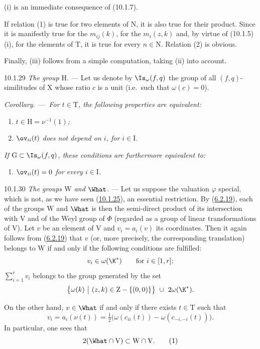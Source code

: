 \documentclass[12pt,a4paper,oneside,english]{smfart}
\makeatletter
\newcommand{\btanchor}[1]{\leavevmode\Hy@raisedlink{\hypertarget{bt:#1}{}}}
\newcommand{\btref}[1]{\hyperlink{bt:#1}{#1}}
\newcommand{\btunnum}[1]{\par\medskip\noindent\emph{#1}.\ ---\ \ignorespaces}
\theoremstyle{definition}
\theoremstyle{bt}
\makeatother
\begin{document}
\pf
(i) is an immediate consequence of (10.1.7).

If relation (1) is true for two elements of $\mathrm{N}$, it is also true for
their product. Since it is manifestly true for the $m_{ij}(k)$, for the
$m_i(z,k)$ and, by virtue of (10.1.5)\,(i), for the elements of $\mathrm{T}$, it
is true for every $n\in\mathrm{N}$. Relation (2) is obvious.

Finally, (iii) follows from a simple computation, taking (ii) into account.

\num{10.1.29}\btanchor{10.1.29} \emph{The group $\mathrm{H}$.} --- Let us denote by
$\Is_\omega(f,q)$ the group of all $(f,q)$-similitudes of $\mathrm{X}$ whose
ratio $c$ is a unit (i.e.\ such that $\omega(c)=0$).

\btunnum{Corollary}\emph{For $t\in\mathrm{T}$, the following
properties are equivalent:}
\begin{enumerate}[label=(\roman*),leftmargin=2.5em]
\item \emph{$t\in \mathrm{H}=\nu^{-1}(1)$;}
\item \emph{$\ov_{ii}(t)$ does not depend on $i$, for $i\in\mathrm{I}$.}
\end{enumerate}
\emph{If $\mathrm{G}\subset \Is_\omega(f,q)$, these conditions are furthermore
equivalent to:}
\begin{enumerate}[label=(\roman*),leftmargin=2.5em,start=3]
\item \emph{$\ov_{ii}(t)=0$ for every $i\in\mathrm{I}$.}
\end{enumerate}

\num{10.1.30}\btanchor{10.1.30} \emph{The groups $\mathrm{W}$ and $\What$.} --- Let us suppose the
valuation $\varphi$ special, which is not, as we have seen (\btref{10.1.25}), an
essential restriction. By (\btref{6.2.19}), each of the groups $\mathrm{W}$ and $\What$
is then the semi-direct product of its intersection with $\mathrm{V}$ and of the
Weyl group of $\Phi$ (regarded as a group of linear transformations of
$\mathrm{V}$). Let $v$ be an element of $\mathrm{V}$ and $v_i=a_i(v)$ its
coordinates. Then it again follows from (\btref{6.2.19}) that $v$ (or, more precisely,
the corresponding translation) belongs to $\mathrm{W}$ if and only if the
following conditions are fulfilled:
\[
v_i\in\omega(\K^{*})\qquad\text{for } i\in[1,r];
\]
$\sum_{i=1}^{r} v_i$ belongs to the group generated by the set
\[
\bigl\{\omega(k)\ \big|\ (z,k)\in \mathrm{Z}-\{(0,0)\}\bigr\}\ \cup\ 2\omega(\K^{*}).
\]

On the other hand, $v\in\What$ if and only if there exists $t\in\mathrm{T}$ such
that
\[
v_i=a_i(\nu(t))=\tfrac{1}{2}\bigl(\omega(c_{ii}(t))-\omega(c_{-i,-i}(t))\bigr).
\]
In particular, one sees that
\begin{equation*}
2(\What\cap \mathrm{V})\subset \mathrm{W}\cap \mathrm{V}.
\tag{1}
\end{equation*}
\end{document}
